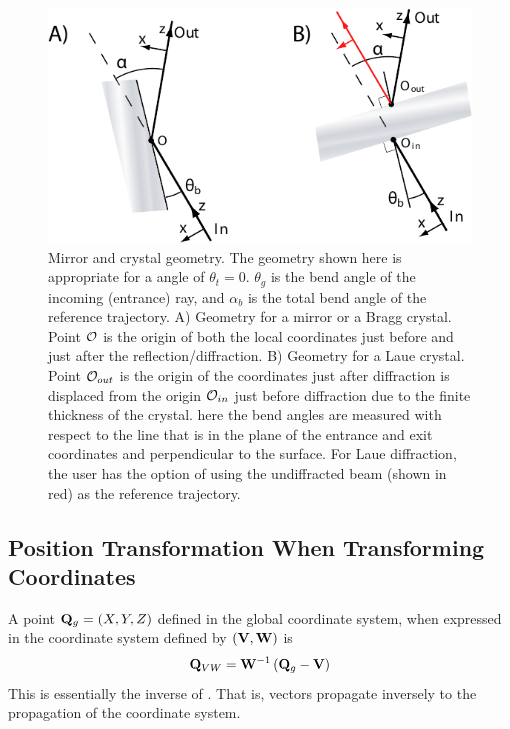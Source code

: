 \begin{figure}
  \centering \includegraphics{mirror.pdf} 
\caption[Mirror and crystal geometry] {Mirror and crystal geometry.
The geometry shown here is appropriate for a  angle of
$\theta_t = 0$.  $\theta_g$ is the bend angle of the incoming
(entrance) ray, and $\alpha_b$ is the total bend
angle of the reference trajectory. A) Geometry for a mirror or a Bragg
crystal. Point ${\cal O}$ is the origin of both the local coordinates
just before and just after the reflection/diffraction. B) Geometry for
a Laue crystal.  Point ${\cal O}_{out}$ is the origin of the coordinates
just after diffraction is displaced from the origin ${\cal O}_{in}$ just
before diffraction due to the finite thickness of the crystal. here
the bend angles are measured with respect to the line that is in
the plane of the entrance and exit coordinates and perpendicular to
the surface. For Laue diffraction, the user has the option of using
the undiffracted beam (shown in red) as the reference trajectory.
  }  
  \label{f:mirror}
\end{figure}

\subsection{Position Transformation When Transforming Coordinates}
\label{s:pos.trans}

A point ${\bf Q}_g = (X, Y, Z)$ defined in the global coordinate system,
when expressed in the coordinate system defined by $({\bf V}, {\bf W})$ is
\begin{equation}
  {\bf Q}_{VW} = {\bf W}^{-1} \left( {\bf Q}_g - {\bf V} \right)
  \label{rwrv}
\end{equation}
This is essentially the inverse of . That is, vectors
propagate inversely to the propagation of the coordinate system.

